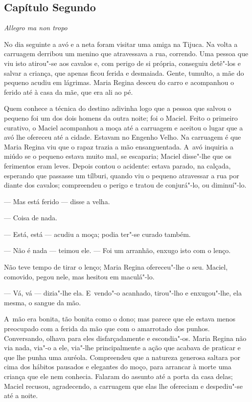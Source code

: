 \begin{linenumbers}
\section{Capítulo Segundo}

\emph{Allegro ma non tropo}

No dia seguinte a avó e a neta foram visitar uma amiga na Tijuca. Na
volta a carruagem derribou um menino que atravessava a rua, correndo.
Uma pessoa que viu isto atirou"-se aos cavalos e, com perigo de si
própria, conseguiu detê"-los e salvar a criança, que apenas ficou ferida
e desmaiada. Gente, tumulto, a mãe do pequeno acudiu em lágrimas. Maria
Regina desceu do carro e acompanhou o ferido até à casa da mãe, que era
ali ao pé.

Quem conhece a técnica do destino adivinha logo que a pessoa que salvou
o pequeno foi um dos dois homens da outra noite; foi o Maciel. Feito o
primeiro curativo, o Maciel acompanhou a moça até a carruagem e aceitou
o lugar que a avó lhe ofereceu até a cidade. Estavam no Engenho Velho.
Na carruagem é que Maria Regina viu que o rapaz trazia a mão
ensanguentada. A~avó inquiria a miúdo se o pequeno estava muito mal, se
escaparia; Maciel disse"-lhe que os ferimentos eram leves. Depois contou
o acidente: estava parado, na calçada, esperando que passasse um
tílburi, quando viu o pequeno atravessar a rua por diante dos cavalos;
compreendeu o perigo e tratou de conjurá"-lo, ou diminuí"-lo.

--- Mas está ferido --- disse a velha.

--- Coisa de nada.

--- Está, está --- acudiu a moça; podia ter"-se curado
também.

--- Não é nada --- teimou ele. --- Foi um arranhão,
enxugo isto com o lenço.

Não teve tempo de tirar o lenço; Maria Regina ofereceu"-lhe o seu.
Maciel, comovido, pegou nele, mas hesitou em maculá"-lo.

--- Vá, vá --- dizia"-lhe ela. E~vendo"-o acanhado, tirou"-lho
e enxugou"-lhe, ela mesma, o sangue da mão.

A~mão era bonita, tão bonita como o dono; mas parece que ele estava
menos preocupado com a ferida da mão que com o amarrotado dos punhos.
Conversando, olhava para eles disfarçadamente e escondia"-os. Maria
Regina não via nada, via"-o a ele, via"-lhe principalmente a ação que
acabava de praticar e que lhe punha uma auréola. Compreendeu que a
natureza generosa saltara por cima dos hábitos pausados e elegantes do
moço, para arrancar à morte uma criança que ele nem conhecia. Falaram do
assunto até a porta da casa delas; Maciel recusou, agradecendo, a
carruagem que elas lhe ofereciam e despediu"-se até a noite.


\end{linenumbers}
